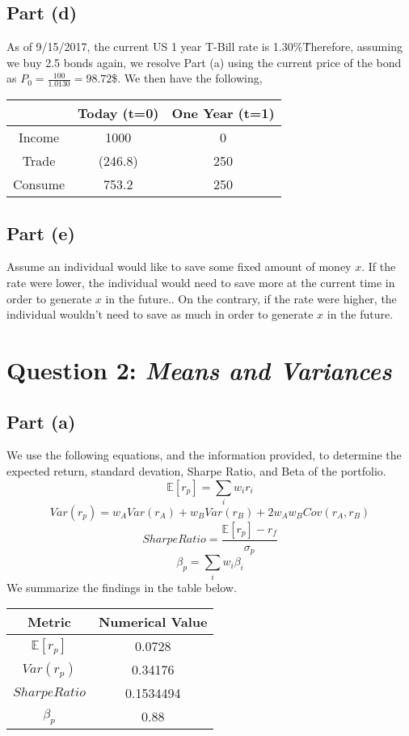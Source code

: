 \documentclass[12pt]{article}
\begin{document}
		\subsection{Part (d)}
		
			As of 9/15/2017, the current US 1 year T-Bill rate is 1.30\%\. Therefore, assuming we buy 2.5 bonds again, we resolve Part (a) using the current
			price of the bond as $P_{0} = \frac{100}{1.0130} = 98.72$\$. We then have the following,
			\begin{center}
 			\begin{tabular}{||c c c||} 
 			\hline
 			 & Today (t=0) &  One Year (t=1) \\ [0.5ex] 
 			\hline \hline
 			Income & 1000 & 0 \\ 
 			\hline
 			Trade  & (246.8) & 250 \\
 			\hline
 			 Consume & 753.2 & 250  \\
 			\hline
			\end{tabular}
			\end{center}
				
		\subsection{Part (e)}
		
			Assume an individual would like to save some fixed amount of money $x$. If the rate were lower, the individual would need to save more at the current time
			in order to generate $x$ in the future.. On the contrary, if the rate were higher, the individual wouldn't need to save as much in order to generate $x$ in the 
			future. 			
		
\section{Question 2: \textit{Means and Variances}}

	\subsection{Part (a)}
	
		We use the following equations, and the information provided, to determine the expected return, standard devation, Sharpe Ratio, and Beta of the portfolio. 
		$$ \mathbb{E}[r_{p}] = \sum_{i} w_{i} r_{i} $$
		$$ Var(r_{p}) = w_{A}Var(r_{A}) + w_{B}Var(r_{B}) + 2w_{A}w_{B}Cov(r_{A},r_{B}) $$
		$$ Sharpe Ratio = \frac{\mathbb{E}[r_{p}] - r_{f}}{\sigma_{p}} $$
		$$ \beta_{p} = \sum_{i} w_{i} \beta_{i} $$
		We summarize the findings in the table below. 
		\begin{center}
 		\begin{tabular}{||c c||} 
 		\hline
 		 Metric & Numerical Value \\ [0.5ex] 
 		\hline \hline
 		$\mathbb{E}[r_{p}]$ & 0.0728 \\ 
 		\hline
 		$Var(r_{p})$ & 0.34176 \\
 		\hline
 		$Sharpe Ratio$ & 0.1534494  \\
 		\hline
 		$\beta_{p}$ & 0.88  \\
 		\hline
		\end{tabular}
		\end{center}
\end{document}
